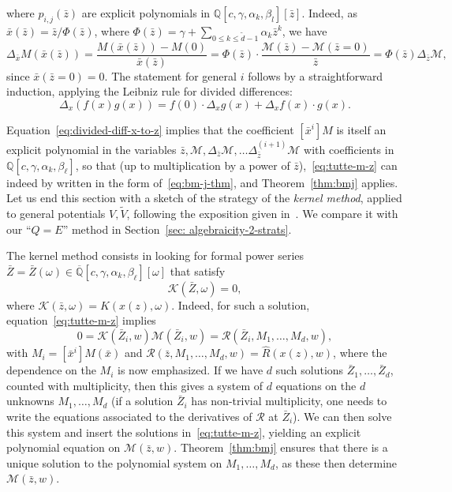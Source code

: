 \documentclass{scrartcl}
\newcommand{\Q}{\mathbb{Q}}
\newcommand{\QQ}{\overline{\mathbb{Q}}}
\newcommand\wt[1]{\widetilde{#1}}
\newcommand\wh[1]{\widehat{#1}}
\begin{document}
where $p_{i,j}(\bar{z})$ are explicit polynomials in $\Q[c,\gamma,\alpha_k,\beta_l][\bar{z}]$. Indeed, as $\bar{x}(\bar{z})=\bar{z}/\Phi(\bar{z})$, where $\Phi(\bar{z})=\gamma+\sum_{0\leq k \leq \wt d -1}\alpha_k\bar{z}^k$, we have
\[
\Delta_{\bar{x}}M(\bar{x}(\bar{z}))=\frac{M(\bar{x}(\bar{z}))-M(0)}{\bar{x}(\bar{z})}=\Phi(\bar{z})\cdot\frac{\mathcal{M}(\bar{z})-\mathcal{M}(\bar{z}=0)}{\bar{z}}=\Phi(\bar{z})\Delta_{\bar{z}}\mathcal{M},
\]
since $\bar{x}(\bar{z}=0)=0$. The statement for general $i$ follows by a straightforward induction, applying the Leibniz rule for divided differences:
\[
\Delta_x(f(x)g(x))=f(0)\cdot\Delta_xg(x) + \Delta_xf(x)\cdot g(x).
\]

Equation~\eqref{eq:divided-diff-x-to-z} implies that the coefficient $[\bar{x}^i]M$ is itself an explicit polynomial in the variables $\bar{z}, \mathcal{M}, \Delta_{\bar{z}}\mathcal{M}, \dots \Delta^{(i+1)}_{\bar{z}}\mathcal{M}$ with coefficients in $\Q[c,\gamma,\alpha_k,\beta_\ell]$, so that (up to multiplication by a power of $\bar{z}$),~\eqref{eq:tutte-m-z} can indeed by written in the form of~\eqref{eq:bm-j-thm}, and Theorem~\ref{thm:bmj} applies.\\

Let us end this section with a sketch of the strategy of the \emph{kernel method}, applied to general potentials $V, \wt V$, following the exposition given in~\cite[Section 3.1]{BoJe06}. We compare it with our ``$Q=E$'' method in Section~\ref{sec: algebraicity-2-strats}.

The kernel method consists in looking for formal power series $\bar{Z}=\bar{Z}(\omega) \in \QQ[c,\gamma,\alpha_k,\beta_\ell][\omega]$ that satisfy 
\begin{equation}
\mathcal{K}(\bar{Z},\omega)=0,
\label{eq:kernel-z-bar}
\end{equation}
where $\mathcal{K}(\bar{z},\omega)=K(x(z),\omega)$. Indeed, for such a solution, equation~\eqref{eq:tutte-m-z} implies
\[
0=\mathcal{K}(\bar{Z}_i,w)\mathcal{M}(\bar{Z}_i,w)=\mathcal{R}(\bar{Z}_i, M_1, \dots, M_d, w),
\]
with $M_i=[\bar{x}^{i}]M(\bar{x})$ and $\mathcal{R}(\bar{z}, M_1, \dots, M_d, w)=\wh{R}(x(z),w)$, where the dependence on the $M_i$ is now emphasized. If we have $d$ such solutions $\bar{Z}_1, \dots, \bar{Z}_d$, counted with multiplicity, then this gives a system of $d$ equations on the $d$ unknowns $M_1, \dots, M_d$ (if a solution $\bar{Z}_i$ has non-trivial multiplicity, one needs to write the equations associated to the derivatives of $\mathcal{R}$ at $\bar{Z}_i$). We can then solve this system and insert the solutions in~\eqref{eq:tutte-m-z}, yielding an explicit polynomial equation on $\mathcal{M}(\bar{z},w)$. Theorem~\ref{thm:bmj} ensures that there is a unique solution to the polynomial system on $M_1,\dots,M_d$, as these then determine $\mathcal{M}(\bar{z},w)$.
\end{document}
